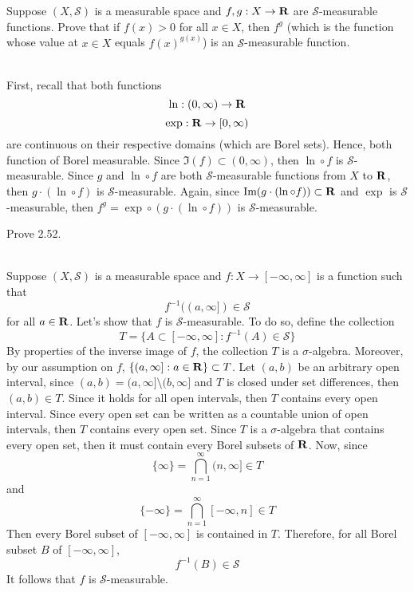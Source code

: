 \begin{exercise}
    Suppose $(X, \mathcal{S})$ is a measurable space and $f,g : X \to \mathbf{R}$ are $\mathcal{S}$-measurable functions. Prove that if $f(x) > 0$ for all $x \in X$, then $f^g$ (which is the function whose value at $x\in X$ equals $f(x)^{g(x)}$) is an $\mathcal{S}$-measurable function. \\
\end{exercise}

\begin{solution}
    \\ First, recall that both functions
    $$\ln : (0, \infty) \to \mathbf{R}$$
    $$\exp : \mathbf{R} \to [0, \infty)$$
    are continuous on their respective domains (which are Borel sets). Hence, both function of Borel measurable. Since $\Im(f) \subset (0, \infty)$, then $\ln \circ f$ is $\mathcal{S}$-measurable. Since $g$ and $\ln \circ f$ are both $\mathcal{S}$-measurable functions from $X$ to $\mathbf{R}$, then $g \cdot (\ln \circ f)$ is $\mathcal{S}$-measurable. Again, since $\text{Im}(g \cdot (\ln \circ f)) \subset \mathbf{R}$ and $\exp$ is $\mathcal{S}$-measurable, then $f^g = \exp \circ (g \cdot (\ln \circ f))$ is $\mathcal{S}$-measurable. \\
\end{solution}

\begin{exercise}
    Prove 2.52. \\
\end{exercise}

\begin{solution}
    \\ Suppose $(X, \mathcal{S})$ is a measurable space and $f : X \to [-\infty, \infty]$ is a function such that 
    $$f^{-1}((a, \infty]) \in \mathcal{S}$$
    for all $a \in \mathbf{R}$. Let's show that $f$ is $\mathcal{S}$-measurable. To do so, define the collection
    $$T = \{A \subset [-\infty, \infty] : f^{-1}(A) \in \mathcal{S} \}$$
    By properties of the inverse image of $f$, the collection $T$ is a $\sigma$-algebra. Moreover, by our assumption on $f$, $\{(a, \infty] : a \in \mathbf{R}\} \subset T$. Let $(a, b)$ be an arbitrary open interval, since $(a,b) = (a, \infty] \setminus (b, \infty]$ and $T$ is closed under set differences, then $(a,b) \in T$. Since it holds for all open intervals, then $T$ contains every open interval. Since every open set can be written as a countable union of open intervals, then $T$ contains every open set. Since $T$ is a $\sigma$-algebra that contains every open set, then it must contain every Borel subsets of $\mathbf{R}$. Now, since 
    $$\{ \infty \} = \bigcap_{n=1}^{\infty}(n, \infty] \in T$$
    and
    $$\{ -\infty \} = \bigcap_{n=1}^{\infty}[-\infty, n] \in T$$
    Then every Borel subset of $[-\infty, \infty]$ is contained in $T$. Therefore, for all Borel subset $B$ of $[-\infty, \infty]$,
    $$f^{-1}(B) \in \mathcal{S}$$
    It follows that $f$ is $\mathcal{S}$-measurable.\\
\end{solution}

